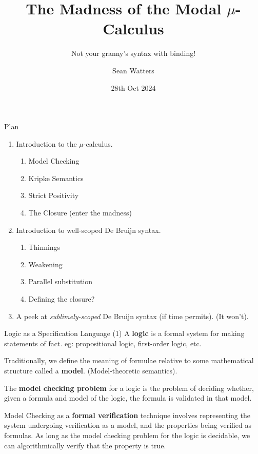 \documentclass[aspectratio=169]{beamer}
\title[$\mu$-Calculus 101]{The Madness of the Modal $\mu$-Calculus}
\subtitle{Not your granny's syntax with binding!}
\author[S. Watters]{Sean Watters}
\institute{University of Strathclyde}
\date{28th Oct 2024}
\begin{document}
\begin{frame}
  \titlepage{}
\end{frame}

\begin{frame}{Plan}
\begin{enumerate}
\item Introduction to the $\mu$-calculus.
        \smallskip
\begin{enumerate}
  \item Model Checking
        \smallskip
  \item Kripke Semantics
        \smallskip
  \item Strict Positivity
        \smallskip
  \item The Closure (enter the madness)
\end{enumerate}
        \smallskip
\item Introduction to well-scoped De Bruijn syntax.
        \smallskip
\begin{enumerate}
  \item Thinnings
        \smallskip
  \item Weakening
        \smallskip
  \item Parallel substitution
        \smallskip
  \item Defining the closure?
\end{enumerate}
        \smallskip
\item A peek at \emph{sublimely-scoped} De Bruijn syntax (if time permits). (It won't).
\end{enumerate}
\end{frame}

\begin{frame}{Logic as a Specification Language (1)}
  A \textbf{logic} is a formal system for making statements of fact.
  eg: propositional logic, first-order logic, etc.

  \bigskip{}
  \pause

  Traditionally, we define the meaning of formulae relative to some mathematical structure called a \textbf{model}.
  (Model-theoretic semantics).

  \bigskip{}
  \pause

  The \textbf{model checking problem} for a logic is the problem of deciding whether, given a formula and model of the logic, the formula is validated in that model.

  \bigskip{}
  \pause

  Model Checking as a \textbf{formal verification} technique involves representing the system undergoing verification as a model, and the properties being verified as formulas.
  As long as the model checking problem for the logic is decidable, we can algorithmically verify that the property is true.
\end{frame}
\end{document}
